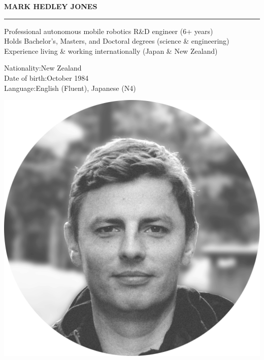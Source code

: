 \documentclass[english]{extarticle}
\begin{document}
{
    \noindent
    \centering
    \Huge\bfseries \textcolor{primary}{MARK HEDLEY JONES}\\
}
\vspace{3mm}
\textcolor{light}{\hrule}
\vspace{3mm}
\noindent
\begin{minipage}[h]{0.78\textwidth}

    \begin{center}
    \begin{minipage}[t]{1.0\textwidth}
    \large
    Professional autonomous mobile robotics R\&D engineer (6+ years)\\
    Holds Bachelor's, Masters, and Doctoral degrees (science \& engineering)\\
    Experience living \& working internationally (Japan \& New Zealand)
    \end{minipage}
    \end{center}


    \vspace{5mm}

    \noindent\begin{center}\parbox[l]{8cm}{
    {Nationality:\hfill{\textmd{\small New Zealand}}}{}\\
    {Date of birth:\hfill{\textmd{\small October 1984}}}{}\\
    {Language:\hfill{\textmd{\small English (Fluent), Japanese (N4)}}}
    }\end{center}

\end{minipage}
\noindent
\begin{minipage}[h]{0.18\textwidth}
\vspace{5mm}
\includegraphics[width=1.2\textwidth]{Profile.png}
\end{minipage}
\end{document}
